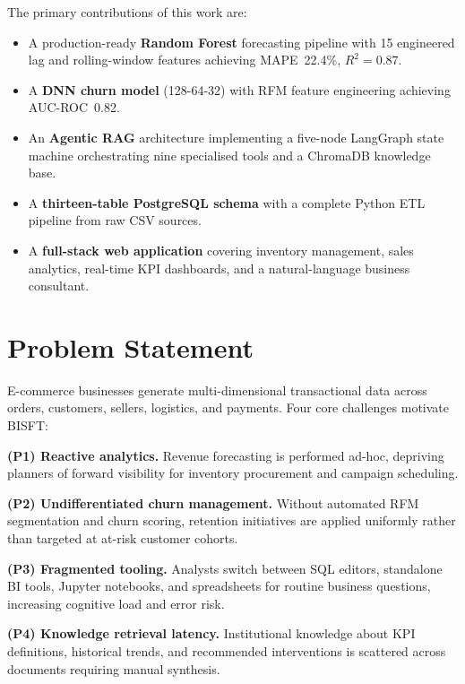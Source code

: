 \documentclass[conference]{IEEEtran}
\begin{document}
The primary contributions of this work are:
\begin{itemize}[leftmargin=*,noitemsep,topsep=2pt]
  \item A production-ready \textbf{Random Forest} forecasting pipeline with 15 engineered
        lag and rolling-window features achieving MAPE~22.4\%, $R^{2}\!=\!0.87$.
  \item A \textbf{DNN churn model} (128-64-32) with RFM feature engineering achieving
        AUC-ROC~0.82.
  \item An \textbf{Agentic RAG} architecture implementing a five-node LangGraph state
        machine orchestrating nine specialised tools and a ChromaDB knowledge base.
  \item A \textbf{thirteen-table PostgreSQL schema} with a complete Python ETL pipeline
        from raw CSV sources.
  \item A \textbf{full-stack web application} covering inventory management, sales analytics,
        real-time KPI dashboards, and a natural-language business consultant.
\end{itemize}

\section{Problem Statement}

E-commerce businesses generate multi-dimensional transactional data across orders,
customers, sellers, logistics, and payments. Four core challenges motivate BISFT:

\textbf{(P1) Reactive analytics.}
Revenue forecasting is performed ad-hoc, depriving planners of forward visibility for
inventory procurement and campaign scheduling.

\textbf{(P2) Undifferentiated churn management.}
Without automated RFM segmentation and churn scoring, retention initiatives are applied
uniformly rather than targeted at at-risk customer cohorts.

\textbf{(P3) Fragmented tooling.}
Analysts switch between SQL editors, standalone BI tools, Jupyter notebooks, and
spreadsheets for routine business questions, increasing cognitive load and error risk.

\textbf{(P4) Knowledge retrieval latency.}
Institutional knowledge about KPI definitions, historical trends, and recommended
interventions is scattered across documents requiring manual synthesis.

\end{document}
